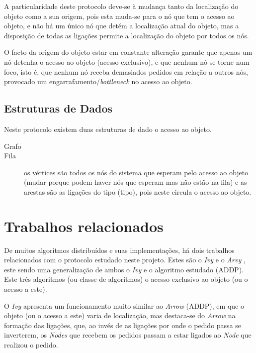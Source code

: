  

A particularidade deste protocolo deve-se à mudança tanto da localização do objeto como a sua origem, pois esta muda-se para o nó que tem o acesso ao objeto, e não há um único nó que detém a localização atual do objeto, mas a disposição de todas as ligações permite a localização do objeto por todos os nós.

O facto da origem do objeto estar em constante alteração garante que apenas um nó detenha o acesso ao objeto (acesso exclusivo), e que nenhum nó se torne num foco, isto é, que nenhum nó receba demasiados pedidos em relação a outros nós, provocado um engarrafamento/\emph{bottleneck} no acesso ao objeto.


\subsection*{Estruturas de Dados}
Neste protocolo existem duas estruturas de dado o acesso ao objeto.

\begin{description}
    \item [Grafo] 
    \item [Fila] os vértices são todos os nós do sistema que esperam pelo acesso ao objeto (mudar porque podem haver nós que esperam mas não estão na fila) e as arestas são as ligações do tipo (tipo), pois neste circula o acesso ao objeto.
\end{description}

\section{Trabalhos relacionados}

De muitos algoritmos distribuídos e suas implementações, há dois trabalhos relacionados com o protocolo estudado neste projeto. Estes são o \emph{Ivy} \cite{Ivy} e o \emph{Arvy} \cite{Arvy}, este sendo uma generalização de ambos o \emph{Ivy} e o algoritmo estudado (\acs{ADDP}). Este três algoritmos (ou classe de algoritmos) o acesso exclusivo ao objeto (ou o acesso a este).


O \emph{Ivy} apresenta um funcionamento muito similar ao \emph{Arrow} (\acs*{ADDP}), em que o objeto (ou o acesso a este) varia de localização, mas destaca-se do \emph{Arrow} na formação das ligações, que, ao invés de as ligações por onde o pedido passa se inverterem, os \emph{Nodes} que recebem os pedidos passam a estar ligados ao \emph{Node} que realizou o pedido.

